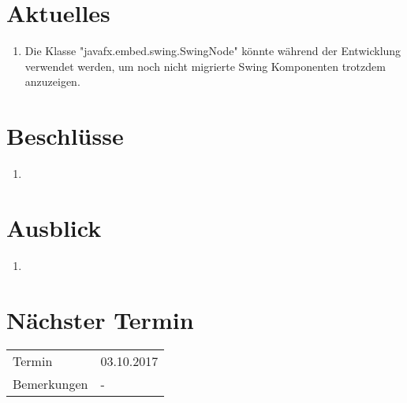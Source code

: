 \documentclass[11pt, a4paper,oneside]{scrartcl}
\begin{document}
\section{Aktuelles}
\begin{enumerate}
	\item Die Klasse "javafx.embed.swing.SwingNode" könnte während der Entwicklung verwendet werden, um noch nicht migrierte Swing Komponenten trotzdem anzuzeigen.
\end{enumerate}

\section{Beschlüsse}
\begin{enumerate}
	\item %
\end{enumerate}

\section{Ausblick}
\begin{enumerate}
	\item 
\end{enumerate}

\section{Nächster Termin}
\begin{tabu} to \linewidth {l X }
	\toprule
	Termin & 03.10.2017 \\
	Bemerkungen & - \\
	\bottomrule
\end{tabu}
\end{document}
